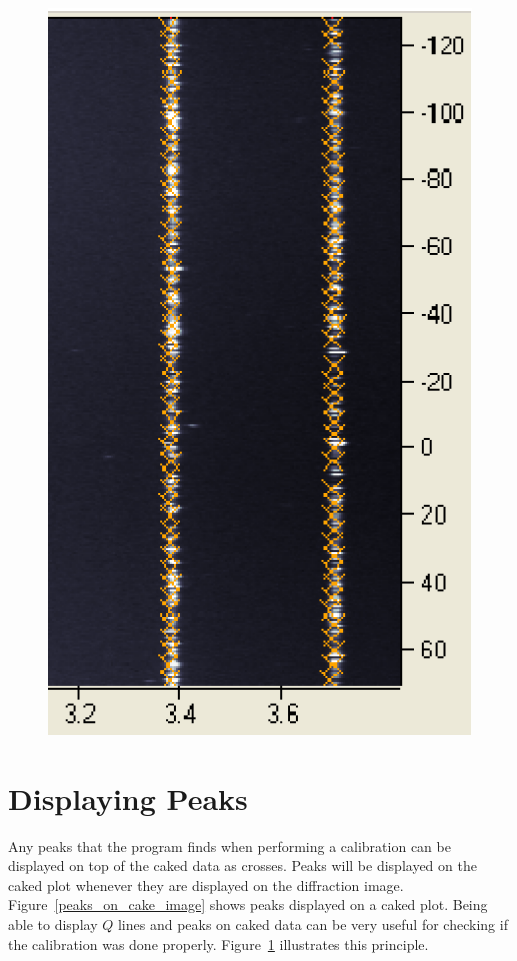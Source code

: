 \begin{figure}[bthp]
{    \includegraphics[scale=.75]{figures/peaks_on_cake_image.eps}}
    \label{calibration_cake}
\end{figure}

\section{Displaying Peaks}\label{displaying_peaks_cake}

Any peaks that the program finds when performing
a calibration can be displayed on top of the caked
data as crosses. Peaks will be displayed on the caked plot whenever 
they are displayed on the diffraction image. 
Figure~\ref{peaks_on_cake_image} 
shows peaks displayed on a caked plot.  Being able to display 
$Q$ lines and peaks on caked data can be very useful for 
checking if the calibration was done properly. 
Figure~\ref{calibration_cake} illustrates this principle.

